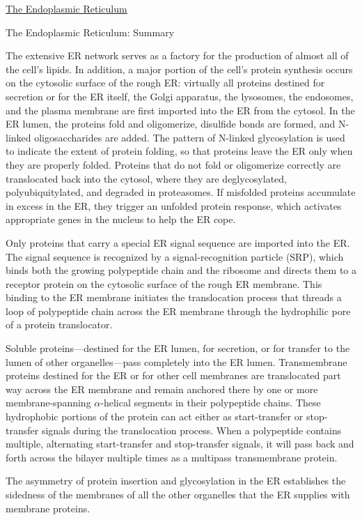 \documentclass[12pt,letterpaper]{article}
\begin{document}
\begin{secbox}{\hyperlink{12}{The Endoplasmic Reticulum}}
{    \hypertarget{12.5.r}{} 
    \begin{probbox}{The Endoplasmic Reticulum: Summary}\end{probbox}
    The extensive ER network serves as a factory for the production of almost all of the cell’s lipids. In addition, a major portion of the cell’s protein synthesis occurs on the cytosolic surface of the rough ER: virtually all proteins destined for secretion or for the ER itself, the Golgi apparatus, the lysosomes, the endosomes, and the plasma membrane are first imported into the ER from the cytosol. In the ER lumen, the proteins fold and oligomerize, disulfide bonds are formed, and N-linked oligosaccharides are added. The pattern of N-linked glycosylation is used to indicate the extent of protein folding, so that proteins leave the ER only when they are properly folded. Proteins that do not fold or oligomerize correctly are translocated back into the cytosol, where they are deglycosylated, polyubiquitylated, and degraded in proteasomes. If misfolded proteins accumulate in excess in the ER, they trigger an unfolded protein response, which activates appropriate genes in the nucleus to help the ER cope. \par 
    \vspace{10pt}
    Only proteins that carry a special ER signal sequence are imported into the ER. The signal sequence is recognized by a signal-recognition particle (SRP), which binds both the growing polypeptide chain and the ribosome and directs them to a receptor protein on the cytosolic surface of the rough ER membrane. This binding to the ER membrane initiates the translocation process that threads a loop of polypeptide chain across the ER membrane through the hydrophilic pore of a protein translocator. \par 
    \vspace{10pt}
    Soluble proteins—destined for the ER lumen, for secretion, or for transfer to the lumen of other organelles—pass completely into the ER lumen. Transmembrane proteins destined for the ER or for other cell membranes are translocated part way across the ER membrane and remain anchored there by one or more membrane-spanning \(\alpha\)-helical segments in their polypeptide chains. These hydrophobic portions of the protein can act either as start-transfer or stop-transfer signals during the translocation process. When a polypeptide contains multiple, alternating start-transfer and stop-transfer signals, it will pass back and forth across the bilayer multiple times as a multipass transmembrane protein. \par
    \vspace{10pt}
    The asymmetry of protein insertion and glycosylation in the ER establishes the sidedness of the membranes of all the other organelles that the ER supplies with membrane proteins.
}\end{secbox}
\end{document}

